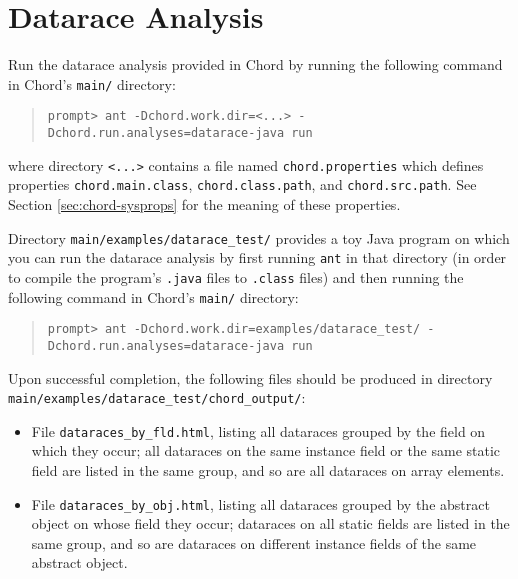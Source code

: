\section{Datarace Analysis}
\label{sec:datarace}

Run the datarace analysis provided in Chord by running the following command in Chord's \verb+main/+ directory:

\begin{quote}
\begin{verbatim}
prompt> ant -Dchord.work.dir=<...> -Dchord.run.analyses=datarace-java run
\end{verbatim}
\end{quote}

where directory \verb+<...>+ contains a file named \verb+chord.properties+ which 
defines properties \verb+chord.main.class+, \verb+chord.class.path+, and \verb+chord.src.path+.
See Section \ref{sec:chord-sysprops} for the meaning of these properties.

Directory \verb+main/examples/datarace_test/+ provides a toy Java program on which you can run the datarace
analysis by first running \verb+ant+ in that directory (in order to compile the program's \verb+.java+ files to
\verb+.class+ files) and then running the following command in Chord's \verb+main/+ directory:

\begin{quote}
\begin{verbatim}
prompt> ant -Dchord.work.dir=examples/datarace_test/ -Dchord.run.analyses=datarace-java run
\end{verbatim}
\end{quote}

Upon successful completion, the following files should be produced in directory
\verb+main/examples/datarace_test/chord_output/+:

\begin{itemize}
\item
File \verb+dataraces_by_fld.html+, listing all dataraces grouped by the field on which they occur; all
dataraces on the same instance field or the same static field are listed in the same group, and so are
all dataraces on array elements.
\item
File \verb+dataraces_by_obj.html+, listing all dataraces grouped by the abstract object on whose field they occur;
dataraces on all static fields are listed in the same group, and so are dataraces on different
instance fields of the same abstract object.
\end{itemize}



